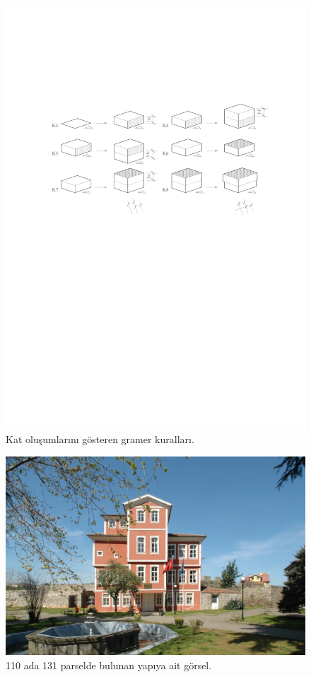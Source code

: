 \documentclass[12pt,turkish,a4paperpaper,]{report}
\begin{document}
\begin{figure}
\centering
\includegraphics[width=1\textwidth,height=\textheight]{source/figures/K3-K8.pdf}
\caption{Kat oluşumlarını gösteren gramer kuralları. \label{K3K7}}
\end{figure}

\begin{figure}
\centering
\includegraphics[width=1\textwidth,height=\textheight]{source/figures/110-131.jpg}
\caption{110 ada 131 parselde bulunan yapıya ait görsel. \label{110131}}
\end{figure}
\end{document}
